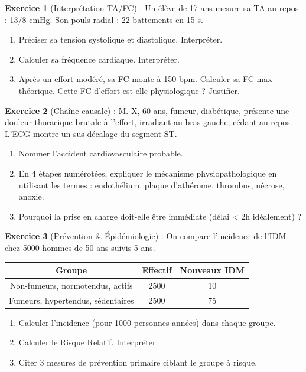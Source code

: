 \documentclass[11pt]{article}
\begin{document}
\begin{exercice}
\textbf{Exercice 1} (Interprétation TA/FC) : Un élève de 17 ans mesure sa TA au repos : 13/8 cmHg. Son pouls radial : 22 battements en 15 s.
\begin{enumerate}
\item Préciser sa tension systolique et diastolique. Interpréter.
\item Calculer sa fréquence cardiaque. Interpréter.
\item Après un effort modéré, sa FC monte à 150 bpm. Calculer sa FC max théorique. Cette FC d'effort est-elle physiologique ? Justifier.
\end{enumerate}

\textbf{Exercice 2} (Chaîne causale) : M. X, 60 ans, fumeur, diabétique, présente une douleur thoracique brutale à l'effort, irradiant au bras gauche, cédant au repos. L'ECG montre un sus-décalage du segment ST.
\begin{enumerate}
\item Nommer l'accident cardiovasculaire probable.
\item En 4 étapes numérotées, expliquer le mécanisme physiopathologique en utilisant les termes : endothélium, plaque d'athérome, thrombus, nécrose, anoxie.
\item Pourquoi la prise en charge doit-elle être immédiate (délai < 2h idéalement) ?
\end{enumerate}

\textbf{Exercice 3} (Prévention \& Épidémiologie) : On compare l'incidence de l'IDM chez 5000 hommes de 50 ans suivis 5 ans.
\begin{center}
\begin{tabular}{|c|c|c|}\hline
\textbf{Groupe} & \textbf{Effectif} & \textbf{Nouveaux IDM} \\ \hline
Non-fumeurs, normotendus, actifs & 2500 & 10 \\ \hline
Fumeurs, hypertendus, sédentaires & 2500 & 75 \\ \hline
\end{tabular}
\end{center}
\begin{enumerate}
\item Calculer l'incidence (pour 1000 personnes-années) dans chaque groupe.
\item Calculer le Risque Relatif. Interpréter.
\item Citer 3 mesures de prévention primaire ciblant le groupe à risque.
\end{enumerate}
\end{exercice}
\end{document}
